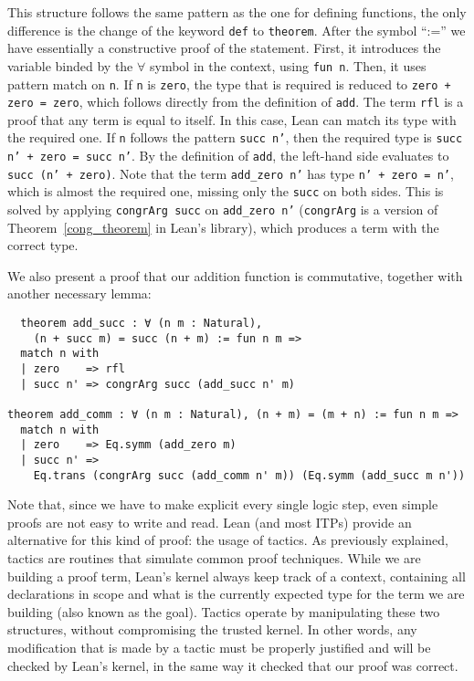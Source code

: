 This structure follows the same pattern as the one for defining functions, the only difference is the change of the keyword \texttt{def} to \texttt{theorem}. After the symbol ``:='' we have essentially a constructive proof of the statement. First, it introduces the variable binded by the $\forall$ symbol in the context, using \texttt{fun n}. Then, it uses pattern match on \texttt{n}. If \texttt{n} is \texttt{zero}, the type that is required is reduced to \texttt{zero + zero = zero}, which follows directly from the definition of \texttt{add}. The term \texttt{rfl} is a proof that any term is equal to itself. In this case, Lean can match its type with the required one. If \texttt{n} follows the pattern \texttt{succ n'}, then the required type is \texttt{succ n' + zero = succ n'}. By the definition of \texttt{add}, the left-hand side evaluates to \texttt{succ (n' + zero)}.
Note that the term \texttt{add\_zero n'} has type \texttt{n' + zero = n'}, which is almost the required one, missing only the \texttt{succ} on both sides. This is solved by applying \texttt{congrArg succ} on \texttt{add\_zero n'} (\texttt{congrArg} is a version of Theorem~\ref{cong_theorem} in Lean's library), which produces a term with the correct type.


We also present a proof that our addition function is commutative, together with another necessary lemma:

\begin{verbatim}
  theorem add_succ : ∀ (n m : Natural),
    (n + succ m) = succ (n + m) := fun n m =>
  match n with
  | zero    => rfl
  | succ n' => congrArg succ (add_succ n' m)

theorem add_comm : ∀ (n m : Natural), (n + m) = (m + n) := fun n m =>
  match n with
  | zero    => Eq.symm (add_zero m)
  | succ n' =>
    Eq.trans (congrArg succ (add_comm n' m)) (Eq.symm (add_succ m n'))
\end{verbatim}

Note that, since we have to make explicit every single logic step, even simple proofs are not easy to write and read. Lean (and most ITPs) provide an alternative for this kind of proof: the usage of tactics. As previously explained, tactics are routines that simulate common proof techniques. While we are building a proof term, Lean's kernel always keep track of a context, containing all declarations in scope and what is the currently expected type for the term we are building (also known as the goal). Tactics operate by manipulating these two structures, without compromising the trusted kernel. In other words, any modification that is made by a tactic must be properly justified and will be checked by Lean's kernel, in the same way it checked that our proof was correct.

